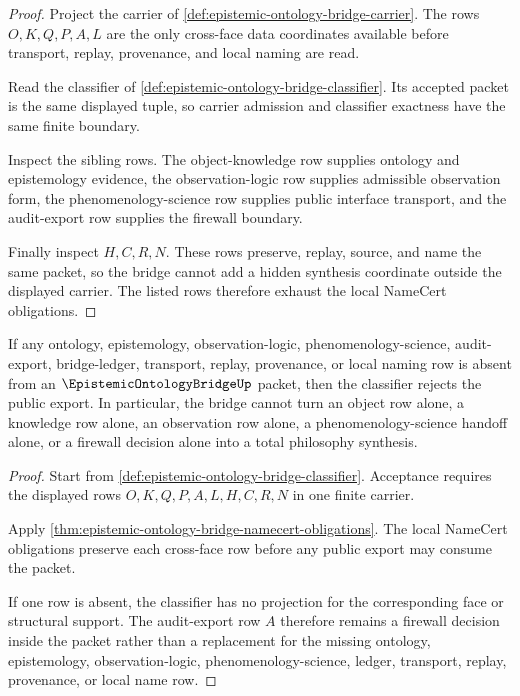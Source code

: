 \begin{proof}
Project the carrier of \autoref{def:epistemic-ontology-bridge-carrier}. The rows $O,K,Q,P,A,L$ are the only cross-face data coordinates available before transport, replay, provenance, and local naming are read.

Read the classifier of \autoref{def:epistemic-ontology-bridge-classifier}. Its accepted packet is the same displayed tuple, so carrier admission and classifier exactness have the same finite boundary.

Inspect the sibling rows. The object-knowledge row supplies ontology and epistemology evidence, the observation-logic row supplies admissible observation form, the phenomenology-science row supplies public interface transport, and the audit-export row supplies the firewall boundary.

Finally inspect $H,C,R,N$. These rows preserve, replay, source, and name the same packet, so the bridge cannot add a hidden synthesis coordinate outside the displayed carrier. The listed rows therefore exhaust the local NameCert obligations.
\end{proof}

\begin{theorem}
\label{thm:epistemic-ontology-bridge-audit-export-boundary}
If any ontology, epistemology, observation-logic, phenomenology-science, audit-export, bridge-ledger, transport, replay, provenance, or local naming row is absent from an $\EpistemicOntologyBridgeUp$ packet, then the classifier rejects the public export. In particular, the bridge cannot turn an object row alone, a knowledge row alone, an observation row alone, a phenomenology-science handoff alone, or a firewall decision alone into a total philosophy synthesis.
\end{theorem}
\begin{proof}
Start from \autoref{def:epistemic-ontology-bridge-classifier}. Acceptance requires the displayed rows $O,K,Q,P,A,L,H,C,R,N$ in one finite carrier.

Apply \autoref{thm:epistemic-ontology-bridge-namecert-obligations}. The local NameCert obligations preserve each cross-face row before any public export may consume the packet.

If one row is absent, the classifier has no projection for the corresponding face or structural support. The audit-export row $A$ therefore remains a firewall decision inside the packet rather than a replacement for the missing ontology, epistemology, observation-logic, phenomenology-science, ledger, transport, replay, provenance, or local name row.
\end{proof}

